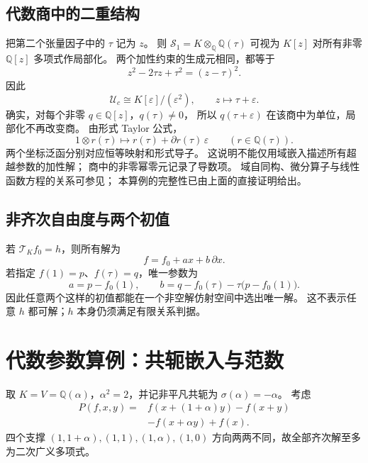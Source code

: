 \documentclass[11pt,a4paper,oneside,openany]{book}
\theoremstyle{lecture}
\newcommand{\Q}{\mathbb Q}
\newcommand{\T}{\mathcal T}
\newcommand{\Uc}{\mathscr U_c}
\numberwithin{equation}{section}
\begin{document}
\subsection{代数商中的二重结构}
把第二个张量因子中的 $\tau$ 记为 $z$。
则 $\mathscr S_1=K\otimes_{\Q}\Q(\tau)$
可视为 $K[z]$ 对所有非零 $\Q[z]$ 多项式作局部化。
两个加性约束的生成元相同，都等于
\[
 z^2-2\tau z+\tau^2=(z-\tau)^2.
\]
因此
\begin{equation}\label{lin:eq:dualnumbers}
 \Uc\cong K[\varepsilon]/(\varepsilon^2),\qquad z\longmapsto\tau+\varepsilon.
\end{equation}
确实，对每个非零 $q\in\Q[z]$，$q(\tau)\ne0$，
所以 $q(\tau+\varepsilon)$ 在该商中为单位，局部化不再改变商。
由形式 Taylor 公式，
\[
 1\otimes r(\tau)\longmapsto r(\tau)+\partial r(\tau)\,\varepsilon
 \qquad(r\in\Q(\tau)).
\]
两个坐标泛函分别对应恒等映射和形式导子。
这说明不能仅用域嵌入描述所有超越参数的加性解；
商中的非零幂零元记录了导数项。
域自同构、微分算子与线性函数方程的关系可参见\cite{KissLaczkovich}；
本算例的完整性已由上面的直接证明给出。

\subsection{非齐次自由度与两个初值}
若 $\T_Kf_0=h$，则所有解为
\[
 f=f_0+ax+b\,\partial x.
\]
若指定 $f(1)=p$、$f(\tau)=q$，唯一参数为
\[
 a=p-f_0(1),\qquad
 b=q-f_0(\tau)-\tau\bigl(p-f_0(1)\bigr).
\]
因此任意两个这样的初值都能在一个非空解仿射空间中选出唯一解。
这不表示任意 $h$ 都可解；$h$ 本身仍须满足有限关系判据。

\section{代数参数算例：共轭嵌入与范数}\label{lin:sec:normexample}
取 $K=V=\Q(\alpha)$，$\alpha^2=2$，并记非平凡共轭为
$\sigma(\alpha)=-\alpha$。
考虑
\begin{equation}\label{lin:eq:normoperator}
 \begin{split}
 P(f,x,y)={}&f(x+(1+\alpha)y)-f(x+y)\\
 &-f(x+\alpha y)+f(x).
 \end{split}
\end{equation}
四个支撑 $(1,1+\alpha),(1,1),(1,\alpha),(1,0)$
方向两两不同，故全部齐次解至多为二次广义多项式。
\end{document}
